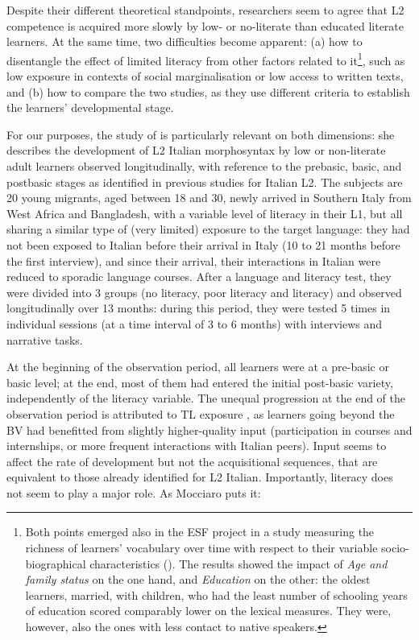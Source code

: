 \documentclass[output=paper]{langscibook}
\begin{document}
Despite their different theoretical standpoints, researchers seem to agree that L2 competence is acquired more slowly by low- or no-literate than educated literate learners. At the same time, two difficulties become apparent: (a) how to disentangle the effect of limited literacy from other factors related to it\footnote{ {Both points emerged also in the ESF project in a study measuring the richness of learners’ vocabulary over time with respect to their variable socio-biographical characteristics (\citealt{vanHoutStrömqvist1993}). The results      showed the impact of} {\textit{Age and family status}} {on the one hand, and} {\textit{Education}} {on the other: the oldest learners, married, with children, who had the least number of schooling years of education scored comparably lower on the lexical measures. They were, however, also the ones with less contact to native speakers.}}, such as low exposure in contexts of social marginalisation or low access to written texts, and (b) how to compare the two studies, as they use different criteria to establish the learners’ developmental stage.


For our purposes, the study of \citet{Mocciaro2019, Mocciaro2020} is particularly relevant on both dimensions: she describes the development of L2 Italian morphosyntax by low or non-literate adult learners observed longitudinally, with reference to the prebasic, basic, and postbasic stages as identified in previous studies for Italian L2. The subjects are 20 young migrants, aged between 18 and 30, newly arrived in Southern Italy from West Africa and Bangladesh, with a variable level of literacy in their L1, but all sharing a similar type of (very limited) exposure to the target language: they had not been exposed to Italian before their arrival in Italy (10 to 21 months before the first interview), and since their arrival, their interactions in Italian were reduced to sporadic language courses. After a language and literacy test, they were divided into 3 groups (no literacy, poor literacy and literacy) and observed longitudinally over 13 months: during this period, they were tested 5 times in individual sessions (at a time interval of 3 to 6 months) with interviews and narrative tasks.  

At the beginning of the observation period, all learners were at a pre-basic or basic level; at the end, most of them had entered the initial post-basic variety, independently of the literacy variable. The unequal progression at the end of the observation period is attributed to TL exposure \citep{Mocciaro2019}, as learners going beyond the BV had benefitted from slightly higher-quality input (participation in courses and internships, or more frequent interactions with Italian peers). Input seems to affect the rate of development but not the acquisitional sequences, that are equivalent to those already identified for L2 Italian. Importantly, literacy does not seem to play a major role. As Mocciaro puts it:\largerpage 
\end{document}
